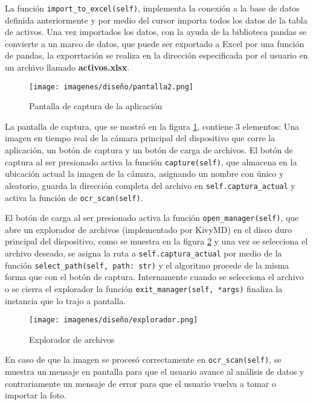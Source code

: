 \par
La función \verb|import_to_excel(self)|, implementa la conexión a la base de datos definida anteriormente y por medio del cursor importa todos los datos de la tabla de activos. Una vez importados los datos, con la ayuda de la biblioteca pandas se convierte a un marco de datos, que puede ser exportado a Excel por una función de pandas, la exporrtación se realiza en la dirección especificada por el usuario en un archivo llamado \textbf{activos.xlsx}. 
\begin{figure}[h!]
    \centering
    \texttt{[image: imagenes/diseño/pantalla2.png]}
    \caption{Pantalla de captura de la aplicación}
    \label{screen2}
\end{figure}
\par
La pantalla de captura, que se mostró en la figura \ref{screen2}, contiene 3 elementos: Una imagen en tiempo real de la cámara principal del dispositivo que corre la aplicación, un botón de captura y un botón de carga de archivos. El botón de captura al ser presionado activa la función \verb|capture(self)|, que almacena en la ubicación actual la imagen de la cámara, asignando un nombre con único y aleatorio, guarda la dirección completa del archivo en \verb|self.captura_actual| y activa la función de \verb|ocr_scan(self)|. 
\par
El botón de carga al ser presionado activa la función \verb|open_manager(self)|, que abre un explorador de archivos (implementado por KivyMD) en el disco duro principal del dispositivo, como se muestra en la figura \ref{xplorer} y una vez se selecciona el archivo deseado, se asigna la ruta a \verb|self.captura_actual| por medio de la función \verb|select_path(self, path: str)| y el algoritmo procede de la misma forma que con el botón de captura. Internamente cuando se selecciona el archivo o se cierra el explorador la función \verb|exit_manager(self, *args)| finaliza la instancia que lo trajo a pantalla.
\par
\begin{figure}[h!]
    \centering
    \texttt{[image: imagenes/diseño/explorador.png]}
    \caption{Explorador de archivos}
    \label{xplorer}
\end{figure}
En caso de que la imagen se procesó correctamente en \verb|ocr_scan(self)|, se muestra un mensaje en pantalla para que el usuario avance al análisis de datos y contrariamente un mensaje de error para que el usuario vuelva a tomar o importar la foto.
\par
